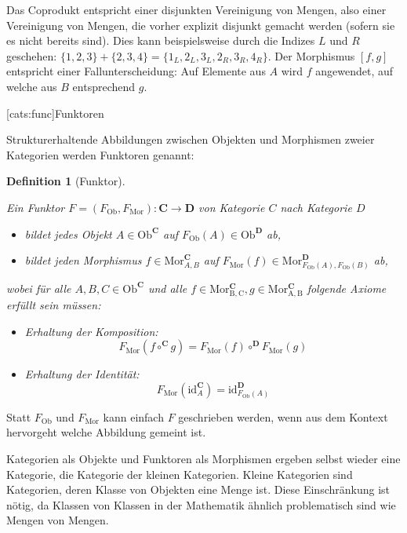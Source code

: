 \documentclass[11pt, a4paper, bibgerm]{scrbook}
\newcommand\lsection{}
\newtheorem{defini}{Definition}
\newcommand{\defi}[2]{%
  \begin{defini}[#1]
    \label{def:#1}
    #2
  \end{defini}
}
\begin{document}
Das Coprodukt entspricht einer disjunkten Vereinigung von Mengen, also
einer Vereinigung von Mengen, die vorher explizit disjunkt gemacht
werden (sofern sie es nicht bereits sind). Dies kann beispielsweise durch
die Indizes $L$ und $R$ geschehen: $\{1,2,3\} + \{2,3,4\} =
\{1_L,2_L,3_L,2_R,3_R,4_R\}$. Der Morphismus $[f,g]$ entspricht einer
Fallunterscheidung: Auf Elemente aus $A$ wird $f$ angewendet, auf welche
aus $B$ entsprechend $g$.

\lsection[cats:func]{Funktoren}

Strukturerhaltende Abbildungen zwischen Objekten und Morphismen zweier
Kategorien werden Funktoren genannt:

\defi{Funktor}{
Ein Funktor $F=(F_{\mathrm{Ob}},F_{\mathrm{Mor}}) : \mathbf{C}
\rightarrow \mathbf{D}$ von Kategorie $C$ nach Kategorie $D$
    \begin{itemize}
    \item bildet jedes Objekt $A \in \mathrm{Ob}^{\mathbf{C}}$ auf $F_{\mathrm{Ob}}(A) \in
      \mathrm{Ob}^{\mathbf{D}}$ ab,
    \item bildet jeden Morphismus $f \in
      \mathrm{Mor}^{\mathbf{C}}_{A,B}$ auf $F_{\mathrm{Mor}}(f) \in
      \mathrm{Mor}^{\mathbf{D}}_{F_{\mathrm{Ob}}(A),F_{\mathrm{Ob}}(B)}$
      ab,
    \end{itemize}
    wobei für alle $A,B,C \in \mathrm{Ob}^{\mathbf{C}}$ und alle $f \in
    \mathrm{Mor^{\mathbf{C}}_{B,C}},g \in
    \mathrm{Mor^{\mathbf{C}}_{A,B}}$ folgende Axiome erfüllt sein
    müssen:
    \begin{itemize}
    \item Erhaltung der Komposition:
      $$F_{\mathrm{Mor}}(f \circ^{\mathbf{C}} g) =
      F_{\mathrm{Mor}}(f) \circ^{\mathbf{D}} F_{\mathrm{Mor}}(g)$$
    \item Erhaltung der Identität:
      $$F_{\mathrm{Mor}}(\mathrm{id}^{\mathbf{C}}_A) =
      \mathrm{id}^{\mathbf{D}}_{F_{\mathrm{Ob}}(A)}$$
    \end{itemize}
}

Statt $F_{\mathrm{Ob}}$ und $F_{\mathrm{Mor}}$ kann einfach $F$
geschrieben werden, wenn aus dem Kontext hervorgeht welche Abbildung
gemeint ist.

Kategorien als Objekte und Funktoren als Morphismen ergeben selbst
wieder eine Kategorie, die Kategorie der kleinen Kategorien. Kleine
Kategorien sind Kategorien, deren Klasse von Objekten eine Menge
ist. Diese Einschränkung ist nötig, da Klassen von Klassen in der
Mathematik ähnlich problematisch sind wie Mengen von Mengen.
\end{document}
